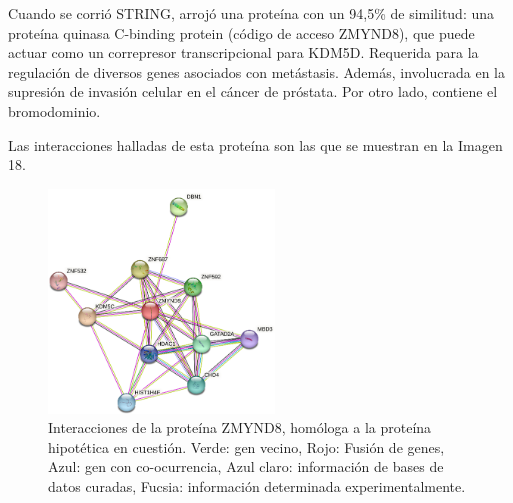 \documentclass[journal,transmag]{IEEEtran}
\begin{document}
Cuando se corrió STRING, arrojó una proteína con un 94,5\% de similitud: una proteína quinasa C-binding protein (código de acceso ZMYND8), que puede actuar como un correpresor transcripcional para KDM5D. Requerida para la regulación de diversos genes asociados con metástasis. Además, involucrada en la supresión de invasión celular en el cáncer de próstata. Por otro lado, contiene el bromodominio.     

Las interacciones halladas de esta proteína son las que se muestran en la Imagen 18.

\begin{figure}[!h]
	\center
	\includegraphics[width=6cm]{imagenes/interaccion.png}
	\caption{Interacciones de la proteína ZMYND8, homóloga a la proteína hipotética en cuestión. Verde: gen vecino, Rojo: Fusión de genes, Azul: gen con co-ocurrencia, Azul claro: información de bases de datos curadas, Fucsia: información determinada experimentalmente. }
	\label{18}
\end{figure}
\end{document}

